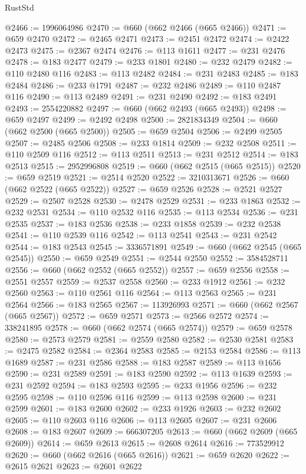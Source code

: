 \begin{lexlean}{RustStd}
\begin{coremodule}
@2466 := 1996064986
@2470 := @660 (@662 @2466 (@665 @2466))
@2471 := @659 @2470
@2472 := @2465 @2471
@2473 := @2451 @2472
@2474 := @2422 @2473
@2475 := @2367 @2474
@2476 := @113 @1611
@2477 := @231 @2476
@2478 := @183 @2477
@2479 := @233 @1801
@2480 := @232 @2479
@2482 := @110 @2480 @116
@2483 := @113 @2482
@2484 := @231 @2483
@2485 := @183 @2484
@2486 := @233 @1791
@2487 := @232 @2486
@2489 := @110 @2487 @116
@2490 := @113 @2489
@2491 := @231 @2490
@2492 := @183 @2491
@2493 := 2554220882
@2497 := @660 (@662 @2493 (@665 @2493))
@2498 := @659 @2497
@2499 := @2492 @2498
@2500 := 2821834349
@2504 := @660 (@662 @2500 (@665 @2500))
@2505 := @659 @2504
@2506 := @2499 @2505
@2507 := @2485 @2506
@2508 := @233 @1814
@2509 := @232 @2508
@2511 := @110 @2509 @116
@2512 := @113 @2511
@2513 := @231 @2512
@2514 := @183 @2513
@2515 := 2952996808
@2519 := @660 (@662 @2515 (@665 @2515))
@2520 := @659 @2519
@2521 := @2514 @2520
@2522 := 3210313671
@2526 := @660 (@662 @2522 (@665 @2522))
@2527 := @659 @2526
@2528 := @2521 @2527
@2529 := @2507 @2528
@2530 := @2478 @2529
@2531 := @233 @1863
@2532 := @232 @2531
@2534 := @110 @2532 @116
@2535 := @113 @2534
@2536 := @231 @2535
@2537 := @183 @2536
@2538 := @233 @1858
@2539 := @232 @2538
@2541 := @110 @2539 @116
@2542 := @113 @2541
@2543 := @231 @2542
@2544 := @183 @2543
@2545 := 3336571891
@2549 := @660 (@662 @2545 (@665 @2545))
@2550 := @659 @2549
@2551 := @2544 @2550
@2552 := 3584528711
@2556 := @660 (@662 @2552 (@665 @2552))
@2557 := @659 @2556
@2558 := @2551 @2557
@2559 := @2537 @2558
@2560 := @233 @1912
@2561 := @232 @2560
@2563 := @110 @2561 @116
@2564 := @113 @2563
@2565 := @231 @2564
@2566 := @183 @2565
@2567 := 113926993
@2571 := @660 (@662 @2567 (@665 @2567))
@2572 := @659 @2571
@2573 := @2566 @2572
@2574 := 338241895
@2578 := @660 (@662 @2574 (@665 @2574))
@2579 := @659 @2578
@2580 := @2573 @2579
@2581 := @2559 @2580
@2582 := @2530 @2581
@2583 := @2475 @2582
@2584 := @2364 @2583
@2585 := @2153 @2584
@2586 := @113 @1689
@2587 := @231 @2586
@2588 := @183 @2587
@2589 := @113 @1656
@2590 := @231 @2589
@2591 := @183 @2590
@2592 := @113 @1639
@2593 := @231 @2592
@2594 := @183 @2593
@2595 := @233 @1956
@2596 := @232 @2595
@2598 := @110 @2596 @116
@2599 := @113 @2598
@2600 := @231 @2599
@2601 := @183 @2600
@2602 := @233 @1926
@2603 := @232 @2602
@2605 := @110 @2603 @116
@2606 := @113 @2605
@2607 := @231 @2606
@2608 := @183 @2607
@2609 := 666307205
@2613 := @660 (@662 @2609 (@665 @2609))
@2614 := @659 @2613
@2615 := @2608 @2614
@2616 := 773529912
@2620 := @660 (@662 @2616 (@665 @2616))
@2621 := @659 @2620
@2622 := @2615 @2621
@2623 := @2601 @2622

\end{coremodule}
\end{lexlean}
